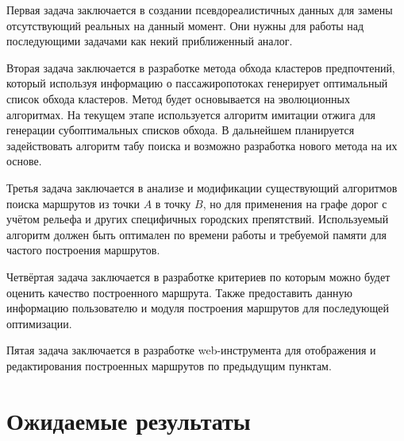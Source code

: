 Первая задача заключается в создании псевдореалистичных данных для замены отсутствующий реальных 
на данный момент. Они нужны для работы над последующими задачами как некий приближенный аналог.

Вторая задача заключается в разработке метода обхода кластеров предпочтений, который используя 
информацию о пассажиропотоках генерирует оптимальный список обхода кластеров. Метод будет 
основывается на эволюционных алгоритмах. На текущем этапе используется алгоритм имитации отжига 
для генерации субоптимальных списков обхода. В дальнейшем планируется задействовать алгоритм 
табу поиска и возможно разработка нового метода на их основе.

Третья задача заключается в анализе и модификации существующий алгоритмов поиска маршрутов из 
точки \( A \) в точку \( B \), но для применения на графе дорог с учётом рельефа и других 
специфичных городских препятствий. Используемый алгоритм должен быть оптимален по времени работы 
и требуемой памяти для частого построения маршрутов.

Четвёртая задача заключается в разработке критериев по которым можно будет оценить качество 
построенного маршрута. Также предоставить данную информацию пользователю и модуля построения 
маршрутов для последующей оптимизации.

Пятая задача заключается в разработке web-инструмента для отображения и редактирования построенных 
маршрутов по предыдущим пунктам.

\section{Ожидаемые результаты}
